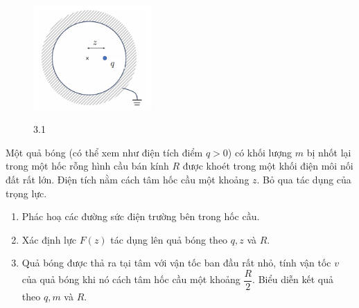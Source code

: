 \vspace{-1cm}
\begin{figure}
  \centering
  \includegraphics[width=0.4\textwidth]{Figures/Problems/Fig 3.1.png}
  \begin{center}
    \figurename{ 3.1}
  \end{center}
\end{figure}

\noindent Một quả bóng (có thể xem như điện tích điểm $q>0$) có khối lượng $m$ bị nhốt lại trong một hốc rỗng hình cầu bán kính $R$ được khoét trong một khối điện môi nối đất rất lớn. Điện tích nằm cách tâm hốc cầu một khoảng $z$. Bỏ qua tác dụng của trọng lực.
\begin{enumerate}
  \item Phác hoạ các đường sức điện trường bên trong hốc cầu.
  \item Xác định lực $F(z)$ tác dụng lên quả bóng theo $q, z$ và $R$.
  \item Quả bóng được thả ra tại tâm với vận tốc ban đầu rất nhỏ, tính vận tốc $v$ của quả bóng khi nó cách tâm hốc cầu một khoảng $\dfrac{R}{2}$. Biểu diễn kết quả theo $q, m$ và $R$.
\end{enumerate}